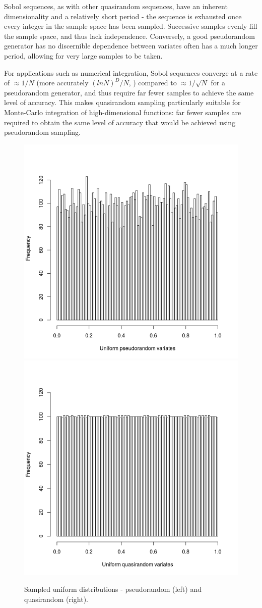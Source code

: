 \documentclass{JASSS}
\begin{document}
Sobol sequences, as with other quasirandom sequences, have an inherent
dimensionality and a relatively short period - the sequence is exhausted
once every integer in the sample space has been sampled. Successive
samples evenly fill the sample space, and thus lack independence.
Conversely, a good pseudorandom generator has no discernible dependence
between variates often has a much longer period, allowing for very large
samples to be taken.

For applications such as numerical integration, Sobol sequences converge
at a rate of \(\approx1/N\) (more accurately \((ln N)^D/N\), \cite{press_numerical_nodate})
compared to \(\approx1/\sqrt N\) for a pseudorandom generator, and thus
require far fewer samples to achieve the same level of accuracy. This makes quasirandom sampling particularly suitable for Monte-Carlo integration of high-dimensional functions: far fewer samples are required to obtain the same level of accuracy that would be achieved using pseudorandom sampling. 

\begin{figure}[!t]
\includegraphics[width=0.5\linewidth]{figures/hist_pseudo} 
\includegraphics[width=0.5\linewidth]{figures/hist_quasi} 
\caption{Sampled uniform distributions -  pseudorandom (left) and quasirandom (right).}
\label{fig:hist_pq_1d}
\end{figure}
\end{document}
